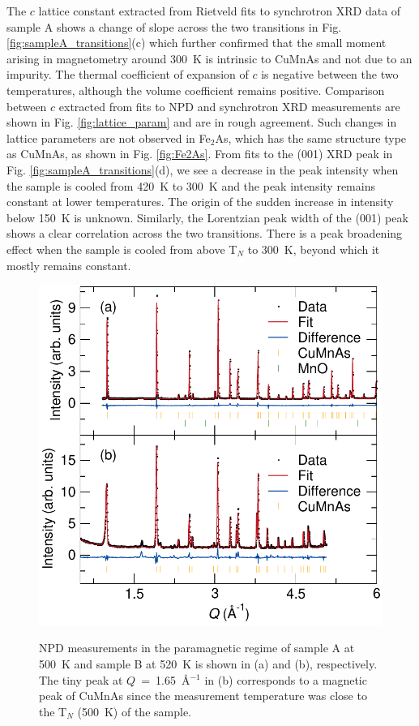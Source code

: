 \documentclass[letterpaper,10pt,doublespacing,edeposit]{uiucthesis2020}
\begin{document}
\begin{mainmatter}
The $c$ lattice constant extracted from Rietveld fits to synchrotron XRD data of sample A shows a change of slope across the two transitions in Fig. \ref{fig:sampleA_transitions}(c) which further confirmed that the small moment arising in magnetometry around 300~K is intrinsic to CuMnAs and not due to an impurity. The thermal coefficient of expansion of $c$ is negative between the two temperatures, although the volume coefficient remains positive. Comparison between $c$ extracted from fits to NPD and synchrotron XRD measurements are shown in Fig. \ref{fig:lattice_param} and are in rough agreement. Such changes in lattice parameters are not observed in Fe$_2$As, which has the same structure type as CuMnAs, as shown in Fig. \ref{fig:Fe2As}. From fits to the (001) XRD peak in Fig. \ref{fig:sampleA_transitions}(d), we see a decrease in the peak intensity when the sample is cooled from 420~K to 300~K and the peak intensity remains constant at lower temperatures. The origin of the sudden increase in intensity below 150~K is unknown. %
Similarly, the Lorentzian peak width of the (001) peak shows a clear correlation across the two transitions. There is a peak broadening effect when the sample is cooled from above T$_N$ to 300~K, beyond which it mostly remains constant.



\begin{figure}
\centering\includegraphics[width=0.7\columnwidth]{figures/ch7/paramagnetic_regime_NPD_cropped.pdf} \\
\caption{\label{fig:paramagnetic_regime}
NPD measurements in the paramagnetic regime of sample A at 500~K and sample B at 520~K is shown in (a) and (b), respectively. The tiny peak at $Q$~=~1.65~\AA$^{-1}$ in (b) corresponds to a magnetic peak of CuMnAs since the measurement temperature was close to the T$_N$ (500~K) of the sample.
} 
\end{figure}


\end{mainmatter}
\end{document}
